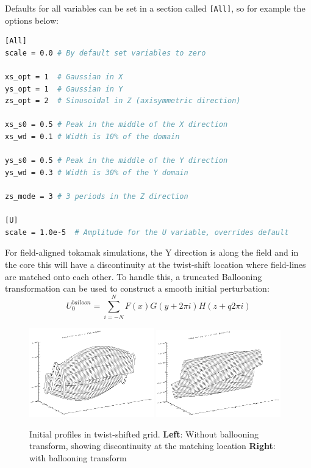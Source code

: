 \documentclass[12pt]{article}
\newcommand{\code}[1]{\texttt{#1}}
\begin{document}
Defaults for all variables can be set in a section called \code{[All]},
so for example the options below:
\begin{lstlisting}[language=bash,numbers=none]
[All]
scale = 0.0 # By default set variables to zero

xs_opt = 1  # Gaussian in X
ys_opt = 1  # Gaussian in Y
zs_opt = 2  # Sinusoidal in Z (axisymmetric direction)

xs_s0 = 0.5 # Peak in the middle of the X direction
xs_wd = 0.1 # Width is 10% of the domain

ys_s0 = 0.5 # Peak in the middle of the Y direction
ys_wd = 0.3 # Width is 30% of the Y domain

zs_mode = 3 # 3 periods in the Z direction

[U]
scale = 1.0e-5  # Amplitude for the U variable, overrides default
\end{lstlisting}

For field-aligned tokamak simulations, the Y direction is along the
field and in the core this will have a discontinuity at the twist-shift
location where field-lines are matched onto each other. To handle this,
a truncated Ballooning transformation can be used to construct a smooth
initial perturbation:
\begin{equation}
U_0^{balloon} = \sum_{i=-N}^N F\left(x\right)G\left(y + 2\pi i\right)H\left(z + q2\pi i\right)
\label{eq:ballooning_transform}
\end{equation}

\begin{figure}[h]
\includegraphics[width=0.48\textwidth, keepaspectratio]{figs/init_noballoon.png}
\includegraphics[width=0.48\textwidth, keepaspectratio]{figs/init_balloon.png}
\caption{Initial profiles in twist-shifted grid. {\bf Left}: Without ballooning transform, showing discontinuity at the matching location {\bf Right}: with ballooning transform}
\label{fig:ballooning}
\end{figure}
\end{document}
